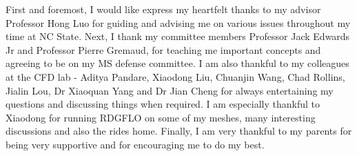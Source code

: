 \begin{acknowledgements}
First and foremost, I would like express my heartfelt thanks to my advisor Professor Hong Luo for guiding and advising me on various issues throughout my time at NC State. Next, I thank my committee members Professor Jack Edwards Jr and Professor Pierre Gremaud, for teaching me important concepts and agreeing to be on my MS defense committee. I am also thankful to my colleagues at the CFD lab - Aditya Pandare, Xiaodong Liu, Chuanjin Wang, Chad Rollins, Jialin Lou, Dr Xiaoquan Yang and Dr Jian Cheng for always entertaining my questions and discussing things when required. I am especially thankful to Xiaodong for running RDGFLO on some of my meshes, many interesting discussions and also the rides home. Finally, I am very thankful to my parents for being very supportive and for encouraging me to do my best.
\end{acknowledgements}

{
\centering
\thesistableofcontents
}

\thesislistoftables

\thesislistoffigures

